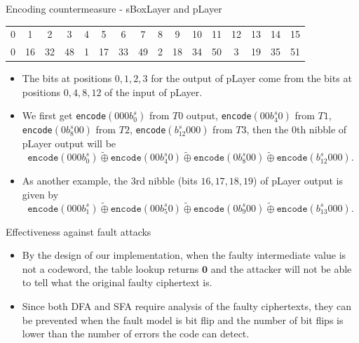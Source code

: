 \begin{frame}{Encoding countermeasure - sBoxLayer and pLayer}
\begin{table}[h]
\centering
\begin{tabular}{cccccccccccccccc}\hline
0 & 1 & 2 & 3 & 4 & 5 & 6 & 7 & 8 & 9 & 10 & 11 & 12 & 13 & 14 & 15 \\
0 & 16 & 32 & 48 & 1 & 17 & 33 & 49 & 2 & 18 & 34 & 50 & 3 & 19 & 35 & 51 \\\hline
\end{tabular}
\end{table}
\begin{example}
    \begin{itemize}
        \item The bits at positions $0,1,2,3$ for the output of pLayer come from the bits at positions $0,4,8,12$ of the input of pLayer.
       \item We first get \texttt{encode}$(000b_0^s)$ from $T0$ output, \texttt{encode}$(00b_4^s0)$ from $T1$, \texttt{encode}$(0b_8^s00)$ from $T2$, \texttt{encode}$(b_{12}^s000)$ from $T3$, then the $0$th nibble of pLayer output will be
\[
\texttt{encode}(000b_0^s)\widetilde{\oplus}\texttt{encode}(00b_4^s0)\widetilde{\oplus}\texttt{encode}(0b_8^s00)\widetilde{\oplus}\texttt{encode}(b_{12}^s000).
\]
\item As another example, the $3$rd nibble (bits $16,17,18,19$) of pLayer output is given by
\[
\texttt{encode}(000b_1^s)\widetilde{\oplus}\texttt{encode}(00b_5^s0)\widetilde{\oplus}\texttt{encode}(0b_9^s00)\widetilde{\oplus}\texttt{encode}(b_{13}^s000).
\]
    \end{itemize}
\end{example}
\end{frame}

\begin{frame}{Effectiveness against fault attacks}
    \begin{itemize}
        \item By the design of our implementation, when the faulty intermediate value is not a codeword, the table lookup returns $\boldsymbol{0}$ and the attacker will not be able to tell what the original faulty ciphertext is.
        \item Since both DFA and SFA require analysis of the faulty ciphertexts, they can be prevented when the fault model is bit flip and the number of bit flips is lower than the number of errors the code can detect.
    \end{itemize}
\end{frame}

